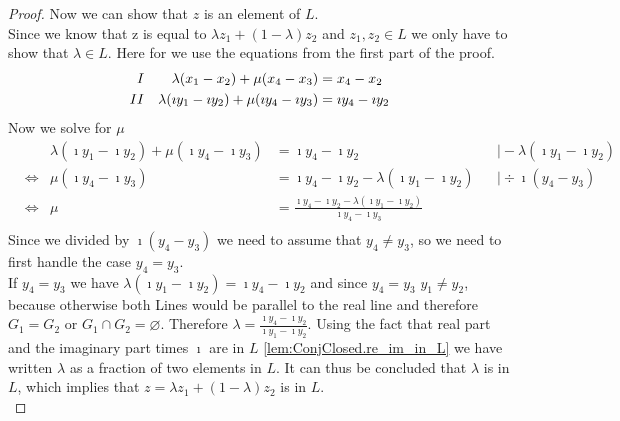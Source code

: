 \begin{proof}
    Now we can show that $z$ is an element of $L$.\\
    Since we know that z is equal to $\lambda z_1 + (1-\lambda)z_2$ and $z_1, z_2 \in L$ we only have to show that $\lambda \in L$. Here for we use the equations from the first part of the proof.
    \begin{align*}
        \RNum{1} &&\lambda(x_1 - x_2)+\mu(x_4-x_3) &= x_4-x_2\\
        \RNum{2} &&\lambda(\imath y_1 - \imath y_2)+\mu(\imath y_4-\imath y_3) &= \imath y_4-\imath y_2
    \end{align*}
    Now we solve  for $\mu$ 
    \begin{align*}
        && \lambda(\imath y_1 - \imath y_2)+\mu(\imath y_4-\imath y_3) &= \imath y_4-\imath y_2 && \mid -\lambda(\imath y_1 - \imath y_2)\\
        &\Leftrightarrow & \mu(\imath y_4-\imath y_3) &= \imath y_4-\imath y_2 - \lambda(\imath y_1 - \imath y_2) && \mid \div \imath(y_4-y_3)\\
        &\Leftrightarrow & \mu &= \frac{\imath y_4-\imath y_2 - \lambda(\imath y_1 - \imath y_2)}{\imath y_4-\imath y_3}\\
    \end{align*}
    Since we divided by $\imath (y_4-y_3)$ we need to assume that $y_4 \ne y_3$, so we need to first handle the case $y_4 = y_3$.\\
    If $y_4 = y_3$ we have $\lambda(\imath y_1 - \imath y_2) = \imath y_4-\imath y_2$ and since $y_4 = y_3$ $y_1 \ne y_2$, because otherwise both Lines would be parallel to the real line and therefore $G_1 = G_2$ or $G_1 \cap G_2 = \varnothing$. 
    Therefore $\lambda = \frac{\imath y_4-\imath y_2}{\imath y_1 - \imath y_2}$. Using the fact that real part and the imaginary part times $\imath$ are in $L$ \ref{lem:ConjClosed.re_im_in_L} we have written $\lambda$ as a fraction of two elements in $L$. 
    It can thus be concluded that $\lambda$ is in $L$, which implies that $z = \lambda z_1 + (1-\lambda)z_2$ is in $L$.\\
   

\end{proof}

